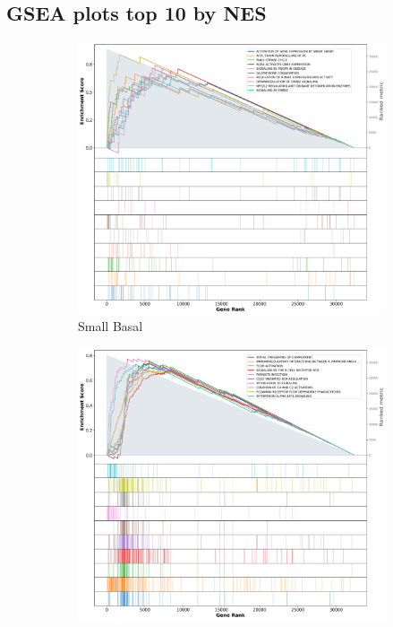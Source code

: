 \begin{appendices}
\subsection{GSEA plots top 10 by NES}
\begin{figure}[!h]
    \captionsetup[subfigure]{justification=centering}
    \centering
    \begin{subfigure}[!t]{0.4\textwidth}
        \centering
        \includegraphics[width=\textwidth,keepaspectratio]{Sections/Network_I/Resources/selective_pruning/gsea/smallBasal_10_top_manTerms.png}
        \caption{Small Basal}
        \label{fig:ap:gsea_smallBasal}
    \end{subfigure}
    \begin{subfigure}[!t]{0.4\textwidth}
        \centering
        \includegraphics[width=\textwidth,keepaspectratio]{Sections/Network_I/Resources/selective_pruning/gsea/largeBasal_10_top_manTerms.png}

\end{subfigure}
\end{figure}
\end{appendices}
